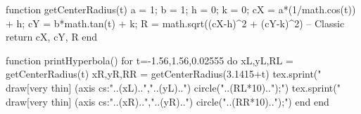 \begin{luacode*}
function getCenterRadius(t)
    a = 1;
    b = 1;
    h = 0;
    k = 0;
    cX = a*(1/math.cos(t)) + h;
    cY = b*math.tan(t) + k;
    R = math.sqrt((cX-h)^2 + (cY-k)^2) -- Classic
    return cX, cY, R
end

function printHyperbola()
    for t=-1.56,1.56,0.02555 do
        xL,yL,RL = getCenterRadius(t)
        xR,yR,RR = getCenterRadius(3.1415+t)
        tex.sprint("\\draw[very thin] (axis cs:"..(xL)..","..(yL)..") circle("..(RL*10)..");")
        tex.sprint("\\draw[very thin] (axis cs:"..(xR)..","..(yR)..") circle("..(RR*10)..");")
    end
end
\end{luacode*}